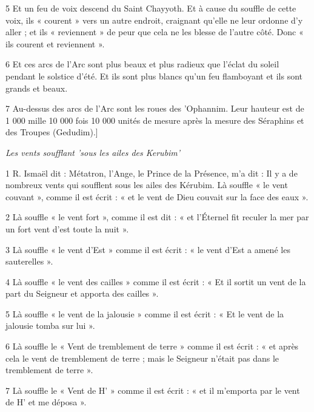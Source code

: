 \par 5 Et un feu de voix descend du Saint Chayyoth. Et à cause du souffle de cette voix, ils « courent » vers un autre endroit, craignant qu'elle ne leur ordonne d'y aller ; et ils « reviennent » de peur que cela ne les blesse de l’autre côté. Donc « ils courent et reviennent ».

\par 6 Et ces arcs de l'Arc sont plus beaux et plus radieux que l'éclat du soleil pendant le solstice d'été. Et ils sont plus blancs qu’un feu flamboyant et ils sont grands et beaux.

\par 7 Au-dessus des arcs de l'Arc sont les roues des 'Ophannim. Leur hauteur est de 1 000 mille 10 000 fois 10 000 unités de mesure après la mesure des Séraphins et des Troupes (Gedudim).]


\par \textit{Les vents soufflant 'sous les ailes des Kerubim'}

\par 1 R. Ismaël dit : Métatron, l'Ange, le Prince de la Présence, m'a dit : Il y a de nombreux vents qui soufflent sous les ailes des Kérubim. Là souffle « le vent couvant », comme il est écrit : « et le vent de Dieu couvait sur la face des eaux ».

\par 2 Là souffle « le vent fort », comme il est dit : « et l'Éternel fit reculer la mer par un fort vent d'est toute la nuit ».

\par 3 Là souffle « le vent d'Est » comme il est écrit : « le vent d'Est a amené les sauterelles ».

\par 4 Là souffle « le vent des cailles » comme il est écrit : « Et il sortit un vent de la part du Seigneur et apporta des cailles ».

\par 5 Là souffle « le vent de la jalousie » comme il est écrit : « Et le vent de la jalousie tomba sur lui ».

\par 6 Là souffle le « Vent de tremblement de terre » comme il est écrit : « et après cela le vent de tremblement de terre ; mais le Seigneur n'était pas dans le tremblement de terre ».

\par 7 Là souffle le « Vent de H' » comme il est écrit : « et il m'emporta par le vent de H' et me déposa ».

